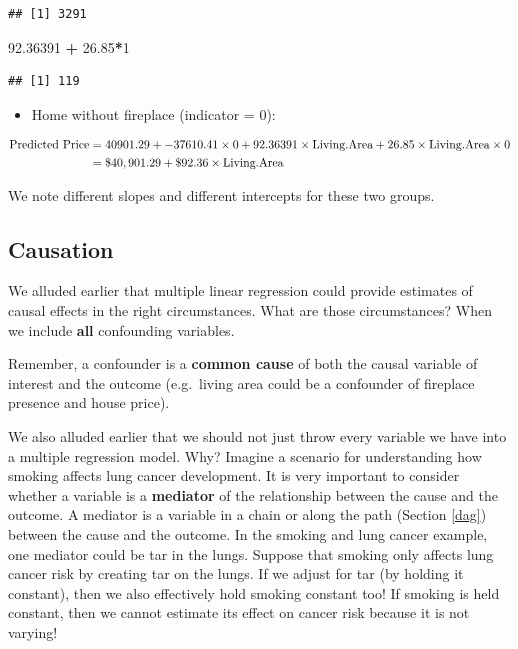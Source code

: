\documentclass[]{book}
\newenvironment{Shaded}{\begin{snugshade}}{\end{snugshade}}
\newcommand{\DecValTok}[1]{\textcolor[rgb]{0.00,0.00,0.81}{#1}}
\newcommand{\FloatTok}[1]{\textcolor[rgb]{0.00,0.00,0.81}{#1}}
\newcommand{\OperatorTok}[1]{\textcolor[rgb]{0.81,0.36,0.00}{\textbf{#1}}}
\newcommand{\StringTok}[1]{\textcolor[rgb]{0.31,0.60,0.02}{#1}}
\providecommand{\tightlist}{%
  \setlength{\itemsep}{0pt}\setlength{\parskip}{0pt}}
\begin{document}
\begin{verbatim}
## [1] 3291
\end{verbatim}

\begin{Shaded}
\begin{Highlighting}[]
\FloatTok{92.36391} \OperatorTok{+}\StringTok{ }\FloatTok{26.85}\OperatorTok{*}\DecValTok{1}
\end{Highlighting}
\end{Shaded}

\begin{verbatim}
## [1] 119
\end{verbatim}

\begin{itemize}
\tightlist
\item
  Home without fireplace (indicator = 0):
\end{itemize}

\begin{align*}
\hbox{Predicted Price} &= 40901.29 + -37610.41 \times 0 + 92.36391 \times \hbox{Living.Area} + 26.85 \times \hbox{Living.Area} \times 0 \\
&= \$40,901.29 + \$92.36 \times \hbox{Living.Area}
\end{align*}

We note different slopes and different intercepts for these two groups.

\hypertarget{causation}{%
\subsection{Causation}\label{causation}}

We alluded earlier that multiple linear regression could provide estimates of causal effects in the right circumstances. What are those circumstances? When we include \textbf{all} confounding variables.

Remember, a confounder is a \textbf{common cause} of both the causal variable of interest and the outcome (e.g.~living area could be a confounder of fireplace presence and house price).

We also alluded earlier that we should not just throw every variable we have into a multiple regression model. Why? Imagine a scenario for understanding how smoking affects lung cancer development. It is very important to consider whether a variable is a \textbf{mediator} of the relationship between the cause and the outcome. A mediator is a variable in a chain or along the path (Section \ref{dag}) between the cause and the outcome. In the smoking and lung cancer example, one mediator could be tar in the lungs. Suppose that smoking only affects lung cancer risk by creating tar on the lungs. If we adjust for tar (by holding it constant), then we also effectively hold smoking constant too! If smoking is held constant, then we cannot estimate its effect on cancer risk because it is not varying!
\end{document}
